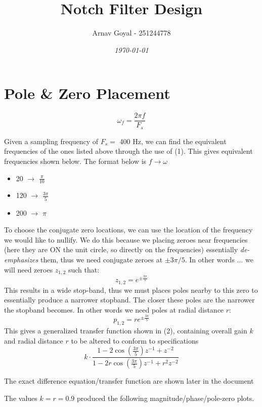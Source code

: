 \documentclass[]{report}
\title{\textbf{Notch Filter Design}}
\date{\textit{\today}}
\author{Arnav Goyal - 251244778}
\begin{document}
\maketitle

\section*{Pole \& Zero Placement}

\begin{equation}
\omega_f = \frac{2\pi f}{F_s}
\end{equation}

Given a sampling frequency of $F_s=$ 400 Hz, we can find the equivalent frequencies of the ones listed above through the use of (1).
This gives equivalent frequencies shown below. The format below is $f \rightarrow \omega$

\begin{itemize}
\item 20  	$\rightarrow$ $\frac{\pi}{10}$ 
\item 120 	$\rightarrow$ $\frac{3\pi}{5}$ 
\item 200  	$\rightarrow$ $\pi$ 
\end{itemize}

To choose the conjugate zero locations, we can use the location of the frequency we would like to nullify. We do this because we placing zeroes near frequencies (here they are ON the unit circle, so directly on the frequencies) essentially \textit{de-emphasizes} them, thus we need conjugate zeroes at $\pm3\pi/5$. In other words ... we will need zeroes $z_{1,2}$ such that:
\[ z_{1,2} = e^{\pm\frac{3\pi}{5}}	\]
This results in a wide stop-band, thus we must places poles nearby to this zero to essentially produce a narrower stopband. The closer these poles are the narrower the stopband becomes. In other words we need poles at radial distance $r$:
\[ p_{1,2} = re^{\pm\frac{3\pi}{5}}	\]
This gives a generalized transfer function shown in (2), containing overall gain $k$ and radial distance $r$ to be altered to conform to specifications
\begin{equation}
k\cdot\frac{1 -2\cos{\left(\frac{3\pi}{5}\right)}z^{-1} + z^{-2}}{1 -2r\cos{\left(\frac{3\pi}{5}\right)}z^{-1} + r^2 z^{-2}}
\end{equation}

The exact difference equation/transfer function are shown later in the document

The values $k = r = 0.9$ produced the following magnitude/phase/pole-zero plots.
\end{document}
